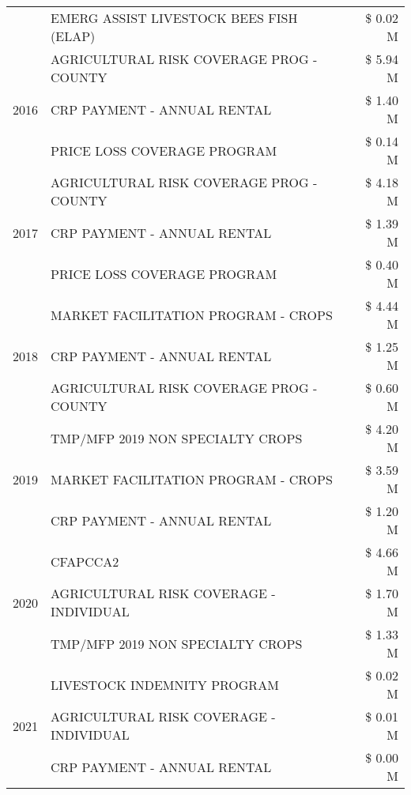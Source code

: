 \begin{tabular}{llr}
 & EMERG ASSIST LIVESTOCK BEES FISH (ELAP) & \$ 0.02 M \\
\cline{1-3}
\multirow[t]{3}{*}{2016} & AGRICULTURAL RISK COVERAGE PROG - COUNTY & \$ 5.94 M \\
 & CRP PAYMENT - ANNUAL RENTAL & \$ 1.40 M \\
 & PRICE LOSS COVERAGE PROGRAM & \$ 0.14 M \\
\cline{1-3}
\multirow[t]{3}{*}{2017} & AGRICULTURAL RISK COVERAGE PROG - COUNTY & \$ 4.18 M \\
 & CRP PAYMENT - ANNUAL RENTAL & \$ 1.39 M \\
 & PRICE LOSS COVERAGE PROGRAM & \$ 0.40 M \\
\cline{1-3}
\multirow[t]{3}{*}{2018} & MARKET FACILITATION PROGRAM - CROPS & \$ 4.44 M \\
 & CRP PAYMENT - ANNUAL RENTAL & \$ 1.25 M \\
 & AGRICULTURAL RISK COVERAGE PROG - COUNTY & \$ 0.60 M \\
\cline{1-3}
\multirow[t]{3}{*}{2019} & TMP/MFP 2019 NON SPECIALTY CROPS & \$ 4.20 M \\
 & MARKET FACILITATION PROGRAM - CROPS & \$ 3.59 M \\
 & CRP PAYMENT - ANNUAL RENTAL & \$ 1.20 M \\
\cline{1-3}
\multirow[t]{3}{*}{2020} & CFAPCCA2 & \$ 4.66 M \\
 & AGRICULTURAL RISK COVERAGE - INDIVIDUAL & \$ 1.70 M \\
 & TMP/MFP 2019 NON SPECIALTY CROPS & \$ 1.33 M \\
\cline{1-3}
\multirow[t]{3}{*}{2021} & LIVESTOCK INDEMNITY PROGRAM & \$ 0.02 M \\
 & AGRICULTURAL RISK COVERAGE - INDIVIDUAL & \$ 0.01 M \\
 & CRP PAYMENT - ANNUAL RENTAL & \$ 0.00 M \\
\cline{1-3}
\bottomrule
\end{tabular}
